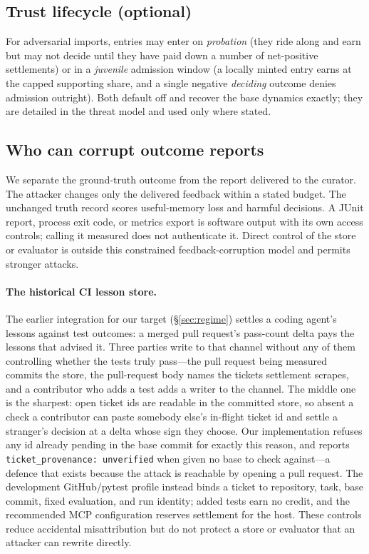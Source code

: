 \subsection{Trust lifecycle (optional)}
For adversarial imports, entries may enter on \emph{probation}
(they ride along and earn but may not decide until they have paid down a
number of net-positive settlements) or in a \emph{juvenile} admission
window (a locally minted entry earns at the capped supporting share, and
a single negative \emph{deciding} outcome denies admission outright). Both
default off and recover the base dynamics exactly; they are detailed in
the threat model and used only where stated.

\subsection{Who can corrupt outcome reports}
\label{sec:whocanlie}

We separate the ground-truth outcome from the report delivered to the
curator. The attacker changes only the delivered feedback within a stated
budget. The unchanged truth record scores useful-memory loss and harmful
decisions. A JUnit report, process exit code, or metrics export is software
output with its own access controls; calling it measured does not authenticate
it. Direct control of the store or evaluator is outside this constrained
feedback-corruption model and permits stronger attacks.

\paragraph{The historical CI lesson store.} The earlier integration for our target
(\S\ref{sec:regime}) settles a coding agent's lessons against test
outcomes: a merged pull request's pass-count delta pays the lessons that
advised it. Three parties write to that channel without any of them
controlling whether the tests truly pass---the pull request being
measured commits the store, the pull-request body names the tickets
settlement scrapes, and a contributor who adds a test adds a writer to
the channel. The middle one is the sharpest: open ticket ids are readable
in the committed store, so absent a check a contributor can paste
somebody else's in-flight ticket id and settle a stranger's decision at a
delta whose sign they choose. Our implementation refuses any id already
pending in the base commit for exactly this reason, and reports
\texttt{ticket\_provenance: unverified} when given no base to check
against---a defence that exists because the attack is reachable by
opening a pull request. The development GitHub/pytest profile instead binds a
ticket to repository, task, base commit, fixed evaluation, and run identity;
added tests earn no credit, and the recommended MCP configuration reserves
settlement for the host. These controls reduce accidental misattribution but
do not protect a store or evaluator that an attacker can rewrite directly.

